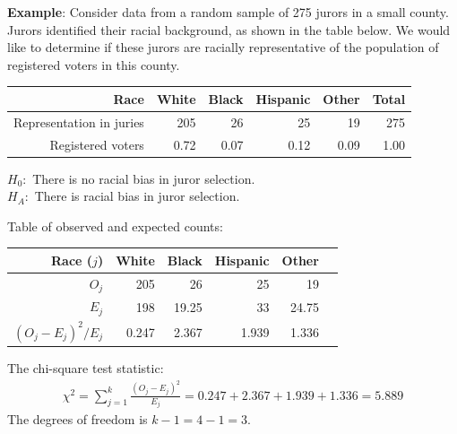 \documentclass[10pt]{beamer}
\begin{document}
\begin{frame}
\textbf{Example}: Consider data from a random sample of 275 jurors in a small county.  Jurors identified their racial background, as shown in the table below.  We would like to determine if these jurors are racially representative of the population of registered voters in this county.\\
\vspace{15pt}

\begin{tabular}{r|rrrrr}
\hline
Race & White & Black & Hispanic & Other & Total\\
\hline
Representation in juries & 205 & 26 & 25 & 19 & 275\\
Registered voters & 0.72 & 0.07 & 0.12 & 0.09 & 1.00\\
\hline
\end{tabular}
\vspace{15pt}

$H_0:$ There is no racial bias in juror selection.\\
$H_A:$ There is racial bias in juror selection.\\
\end{frame}

\begin{frame}
Table of observed and expected counts:\\
\vspace{5pt}
\begin{tabular}{r|rrrrr}
\hline
Race ($j$) & White & Black & Hispanic & Other\\
\hline 
$O_j$ & 205 & 26 & 25 & 19\\
$E_j$ & 198 & 19.25 & 33 & 24.75\\
$(O_j - E_j)^2/E_j$ & 0.247 & 2.367 & 1.939 & 1.336 & \\
\end{tabular}
\vspace{20pt}


The chi-square test statistic:
\begin{align*}
\chi^2 = \sum_{j=1}^k \frac{(O_j - E_j)^2}{E_j} = 0.247  + 2.367 + 1.939 + 1.336 = \boxed{5.889}
\end{align*}
The degrees of freedom is $k-1 = 4-1=3$.
\end{frame}
\end{document}
